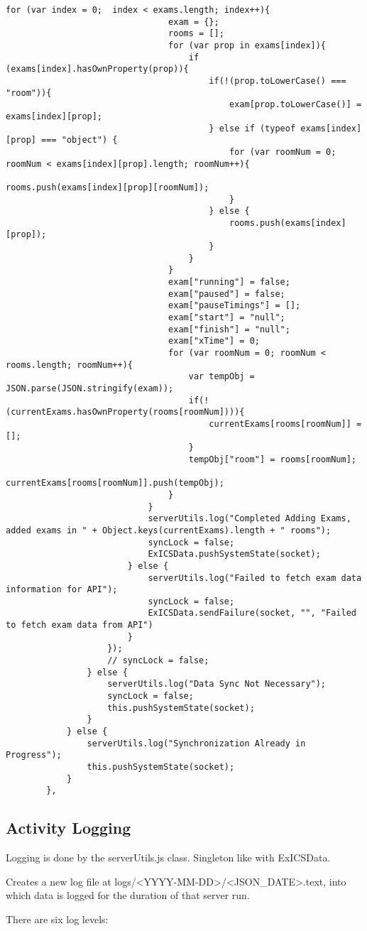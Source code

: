 \begin{lstlisting}[captionpos=b,caption=Exam Data Syncronization Method, tabsize=2,
		breaklines=true]
							for (var index = 0;  index < exams.length; index++){
								exam = {};
								rooms = [];
								for (var prop in exams[index]){
									if (exams[index].hasOwnProperty(prop)){
										if(!(prop.toLowerCase() === "room")){
											exam[prop.toLowerCase()] = exams[index][prop];
										} else if (typeof exams[index][prop] === "object") {
											for (var roomNum = 0; roomNum < exams[index][prop].length; roomNum++){
												rooms.push(exams[index][prop][roomNum]);
											}
										} else {
											rooms.push(exams[index][prop]);
										}
									}
								}
								exam["running"] = false;
								exam["paused"] = false;
								exam["pauseTimings"] = [];
								exam["start"] = "null";
								exam["finish"] = "null";
								exam["xTime"] = 0;
								for (var roomNum = 0; roomNum < rooms.length; roomNum++){
									var tempObj = JSON.parse(JSON.stringify(exam));
									if(!(currentExams.hasOwnProperty(rooms[roomNum]))){
										currentExams[rooms[roomNum]] = [];
									}
									tempObj["room"] = rooms[roomNum];
									currentExams[rooms[roomNum]].push(tempObj);
								}
							}
							serverUtils.log("Completed Adding Exams, added exams in " + Object.keys(currentExams).length + " rooms");
							syncLock = false;
							ExICSData.pushSystemState(socket);
						} else {
							serverUtils.log("Failed to fetch exam data information for API");
							syncLock = false;
							ExICSData.sendFailure(socket, "", "Failed to fetch exam data from API")
						}
					});
					// syncLock = false;
				} else {
					serverUtils.log("Data Sync Not Necessary");
					syncLock = false;
					this.pushSystemState(socket);
				}
			} else {
				serverUtils.log("Synchronization Already in Progress");
				this.pushSystemState(socket);
			}
		},
\end{lstlisting}

\FloatBarrier

\subsection{Activity Logging}
\label{subs:exics_logging}

Logging is done by the serverUtils.js class.  Singleton like with ExICSData.

Creates a new log file at logs/\textless YYYY-MM-DD\textgreater/\textless JSON\_DATE\textgreater.text, into which data is logged for the duration of that server run.

There are six log levels:

